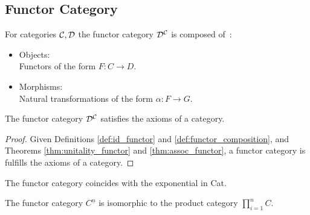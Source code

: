 \subsection{Functor Category}
\begin{definition}
  For categories $\mathcal{C}, \mathcal{D}$ the functor category $\mathcal{D}^{\mathcal{C}}$ is composed
  of~\parencite{leinster:basic_category_theory}:

  \begin{itemize}
    \item Objects:\\
      Functors of the form $F:C\to D$.
    \item Morphisms:\\
      Natural transformations of the form $\alpha:F\to G$.
  \end{itemize}
\end{definition}

\begin{theorem}
  The functor category $\mathcal{D}^{\mathcal{C}}$ satisfies the axioms of a category.

  \begin{proof}
    Given Definitions \ref{def:id_functor} and \ref{def:functor_composition},
    and Theorems \ref{thm:unitality_functor} and \ref{thm:assoc_functor}, a
    functor category is fulfills the axioms of a category.
  \end{proof}
\end{theorem}

\begin{remark}
  The functor category coincides with the exponential in Cat.
\end{remark}

\begin{remark}
  The functor category $C^{\underline{n}}$ is isomorphic to the product category
  $\prod_{i=1}^n C$.
\end{remark}